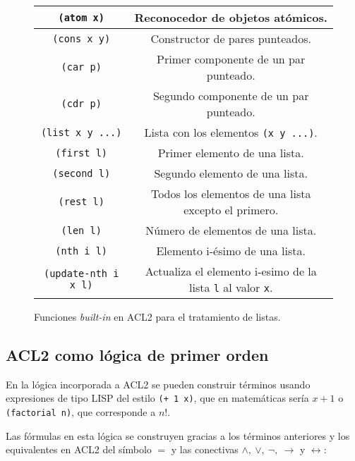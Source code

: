\documentclass[a4paper,10pt]{article}
\begin{document}
\begin{figure}[ht]
\begin{center}
\begin{tabular}{||c|c||}
\hline
\texttt{(atom x)} & Reconocedor de objetos atómicos. \\
\hline
\texttt{(cons x y)} & Constructor de pares punteados. \\
\hline
\texttt{(car p)} & Primer componente de un par punteado. \\
\hline
\texttt{(cdr p)} & Segundo componente de un par punteado. \\
\hline
\texttt{(list x y ...)} & Lista con los elementos \texttt{(x y ...)}. \\
\hline
\texttt{(first l)} & Primer elemento de una lista. \\
\hline
\texttt{(second l)} & Segundo elemento de una lista. \\
\hline
\texttt{(rest l)} & Todos los elementos de una lista excepto el primero. \\
\hline
\texttt{(len l)} & Número de elementos de una lista. \\
\hline
\texttt{(nth i l)} & Elemento i-ésimo de una lista. \\
\hline
\texttt{(update-nth i x l)} & Actualiza el elemento i-esimo de la lista \texttt{l} al valor \texttt{x}. \\
\hline
\end{tabular}
\end{center}
\caption{Funciones \emph{built-in} en ACL2 para el tratamiento de listas.}
\end{figure}

\vspace{12pt}
\subsection{ACL2 como lógica de primer orden}
\vspace{10pt}

En la lógica incorporada a ACL2 se pueden construir términos usando expresiones de tipo LISP del estilo \texttt{(+ 1 x)}, que en matemáticas sería $x+1$ o \texttt{(factorial n)}, que corresponde a $n!$.

\par\vspace{10pt}

Las fórmulas en esta lógica se construyen gracias a los términos anteriores y los equivalentes en ACL2 del símbolo $=$ y las conectivas $\wedge,\ \vee,\ \neg,\ \to$ y $\leftrightarrow$:
\end{document}
